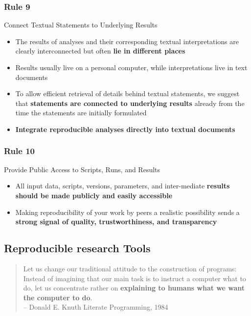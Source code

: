 \documentclass{beamer}
\begin{document}
\begin{frame}
\frametitle{Rule 9}
{\sc Connect Textual Statements to Underlying Results}
\pause
\begin{itemize}
	\item The results of analyses and their corresponding textual interpretations are clearly interconnected but often \textbf{lie in different places}
    \item Results usually live on a personal computer, while interpretations live in text documents
    \item To allow efficient retrieval of details behind textual statements, we suggest that \textbf{statements are connected to underlying results} already from the time the statements are initially formulated
    \item {\bf Integrate reproducible analyses directly into textual documents}
\end{itemize}
\end{frame}
\begin{frame}
\frametitle{Rule 10}
{\sc Provide Public Access to Scripts, Runs, and Results}
\pause
\begin{itemize}
	\item All input data, scripts, versions, parameters, and inter-mediate \textbf{results should be made publicly and easily accessible}
	\item Making reproducibility of your work by peers a realistic possibility sends a \textbf{strong signal of quality, trustworthiness, and transparency}
\end{itemize}
\end{frame}
\begin{frame}
\section{Reproducible research Tools}
\begin{quote}
	\scriptsize    Let us change our traditional attitude to the construction of programs: Instead of imagining that our main task is to instruct a computer what to do, let us concentrate rather on \textbf{explaining to humans what we want the computer to do}.\\
\raggedleft   -- Donald E. Knuth Literate Programming, 1984
\end{quote}
\end{frame}
\end{document}
